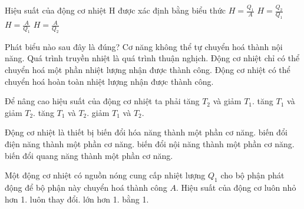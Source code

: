 \begin{ex}
Hiệu suất của động cơ nhiệt H được xác định bằng biểu thức
\choice
{$H = \frac{Q_1}{A}$}
{$H = \frac{Q_2}{Q_1}$}
{\True $H = \frac{A}{Q_1}$}
{$H = \frac{A}{Q_2}$}
\end{ex}

\begin{ex}
Phát biểu nào sau đây là đúng?
\choice
{Cơ năng không thể tự chuyển hoá thành nội năng.}
{Quá trình truyền nhiệt là quá trình thuận nghịch.}
{\True Động cơ nhiệt chỉ có thể chuyển hoá một phần nhiệt lượng nhận được thành công.}
{Động cơ nhiệt có thể chuyển hoá hoàn toàn nhiệt lượng nhận được thành công.}
\end{ex}

\begin{ex}
Để nâng cao hiệu suất của động cơ nhiệt ta phải
\choice
{tăng $T_2$ và giảm $T_1$.}
{\True tăng $T_1$ và giảm $T_2$.}
{tăng $T_1$ và $T_2$.}
{giảm $T_1$ và $T_2$.}
\end{ex}

\begin{ex}
Động cơ nhiệt là thiết bị
\choice
{biến đổi hóa năng thành một phần cơ năng.}
{biến đổi điện năng thành một phần cơ năng.}
{\True biến đổi nội năng thành một phần cơ năng.}
{biến đổi quang năng thành một phần cơ năng.}
\end{ex}

\begin{ex}
Một động cơ nhiệt có nguồn nóng cung cấp nhiệt lượng $Q_1$ cho bộ phận phát động để bộ phận này chuyển hoá thành công $A$. Hiệu suất của động cơ
\choice
{\True luôn nhỏ hơn 1.}
{luôn thay đổi.}
{lớn hơn 1.}
{bằng 1.}
\end{ex}

